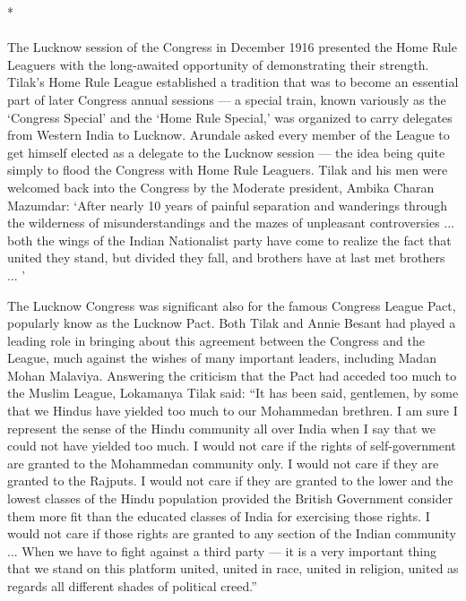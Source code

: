 \begin{multicols}{2}
\begin{center}*\end{center}

\paragraph*{}

The Lucknow session of the Congress in December 1916 presented the Home Rule Leaguers with the long-awaited opportunity of demonstrating their strength. Tilak's Home Rule League established a tradition that was to become an essential part of later Congress annual sessions --- a special train, known variously as the `Congress Special' and the `Home Rule Special,' was organized to carry delegates from Western India to Lucknow. Arundale asked every member of the League to get himself elected as a delegate to the Lucknow session --- the idea being quite simply to flood the Congress with Home Rule Leaguers. Tilak and his men were welcomed back into the Congress by the Moderate president, Ambika Charan Mazumdar: `After nearly 10 years of painful separation and wanderings through the wilderness of misunderstandings and the mazes of unpleasant controversies ... both the wings of the Indian Nationalist party have come to realize the fact that united they stand, but divided they fall, and brothers have at last met brothers ... '

The Lucknow Congress was significant also for the famous Congress League Pact, popularly know as the Lucknow Pact. Both Tilak and Annie Besant had played a leading role in bringing about this agreement between the Congress and the League, much against the wishes of many important leaders, including Madan Mohan Malaviya. Answering the criticism that the Pact had acceded too much to the Muslim League, Lokamanya Tilak said: ``It has been said, gentlemen, by some that we Hindus have yielded too much to our Mohammedan brethren. I am sure I represent the sense of the Hindu community all over India when I say that we could not have yielded too much. I would not care if the rights of self-government are granted to the Mohammedan community only. I would not care if they are granted to the Rajputs. I would not care if they are granted to the lower and the lowest classes of the Hindu population provided the British Government consider them more fit than the educated classes of India for exercising those rights. I would not care if those rights are granted to any section of the Indian community ... When we have to fight against a third party --- it is a very important thing that we stand on this platform united, united in race, united in religion, united as regards all different shades of political creed.''


\end{multicols}
